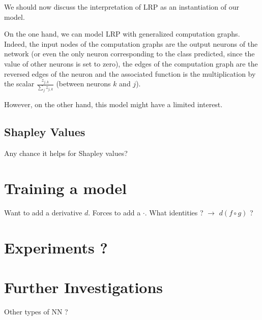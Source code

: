 \documentclass[11pt,a4paper]{article}
\begin{document}
	We should now discuss the interpretation of LRP as an instantiation of our model.
		
	On the one hand, we can model LRP with generalized computation graphs. Indeed, the input nodes of the computation graphs are the output neurons of the network (or even the only neuron corresponding to the class predicted, since the value of other neurons is set to zero), the edges of the computation graph are the reversed edges of the neuron and the associated function is the multiplication by the scalar $\frac{z_{j,k}}{\sum_j z_{j,k}}$ (between neurons $k$ and $j$).
	
	However, on the other hand, this model might have a limited interest.
		
	\subsection{Shapley Values}
	
	Any chance it helps for Shapley values?

\section{Training a model}

Want to add a derivative $d$. Forces to add a $\cdot$. What identities ? $\to$ $d(f \circ g)$ ?

\section{Experiments ?}

\section{Further Investigations}

	Other types of NN ?
\end{document}
